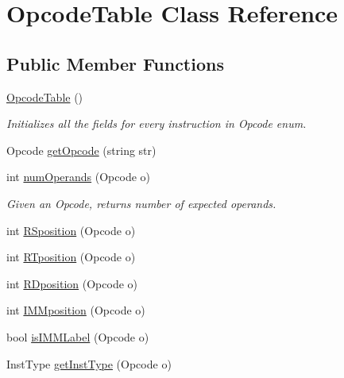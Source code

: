 \hypertarget{class_opcode_table}{}\section{Opcode\+Table Class Reference}
\label{class_opcode_table}
\subsection*{Public Member Functions}
\begin{DoxyCompactItemize}
\item 
\mbox{\hyperlink{class_opcode_table_acb286fdd22f1781abfb0d820b1f345aa}{Opcode\+Table}} ()
\begin{DoxyCompactList}\small\item\em Initializes all the fields for every instruction in Opcode enum. \end{DoxyCompactList}\item 
Opcode \mbox{\hyperlink{class_opcode_table_a0710950ceccf23e2e13d34ff51b332ce}{get\+Opcode}} (string str)
\item 
\mbox{\label{class_opcode_table_af92b88d033ed5f2ba8cdf732ec3a0265}} 
int \mbox{\hyperlink{class_opcode_table_af92b88d033ed5f2ba8cdf732ec3a0265}{num\+Operands}} (Opcode o)
\begin{DoxyCompactList}\small\item\em Given an Opcode, returns number of expected operands. \end{DoxyCompactList}\item 
int \mbox{\hyperlink{class_opcode_table_a6a2b017eeb7cfbc1bf614f52293c5ad4}{R\+Sposition}} (Opcode o)
\item 
int \mbox{\hyperlink{class_opcode_table_a408f6a63857a4443a66685de636b87fd}{R\+Tposition}} (Opcode o)
\item 
int \mbox{\hyperlink{class_opcode_table_ada77e4c8328f3a2730fc0974899da28f}{R\+Dposition}} (Opcode o)
\item 
int \mbox{\hyperlink{class_opcode_table_a588c7ea7780c6186ea685b632b231d33}{I\+M\+Mposition}} (Opcode o)
\item 
bool \mbox{\hyperlink{class_opcode_table_a5ef810fba22c54758dd69b09e8bfae8c}{is\+I\+M\+M\+Label}} (Opcode o)
\item 
\mbox{\label{class_opcode_table_a6674e2b4716bddcaf2514a54bf63a5e4}} 
Inst\+Type \mbox{\hyperlink{class_opcode_table_a6674e2b4716bddcaf2514a54bf63a5e4}{get\+Inst\+Type}} (Opcode o)

\end{DoxyCompactItemize}
